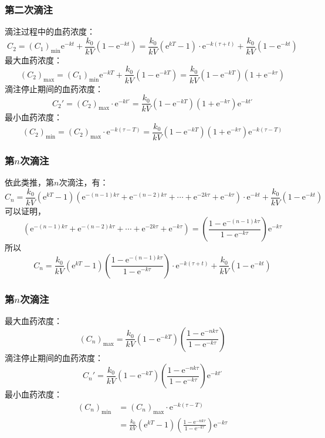 \documentclass[dvipsnames, svgnames, x11names]{beamer}
\begin{document}
\begin{frame}
	\frametitle{第二次滴注}
	滴注过程中的血药浓度：
	\[
		C_2 = (C_1)_\mathrm{min}\mathrm{e}^{-kt} + \frac{k_0}{kV}(1-\mathrm{e}^{-kt}) = \frac{k_0}{kV}(\mathrm{e}^{kT}-1)\cdot \mathrm{e}^{-k(\tau +t)} + \frac{k_0}{kV}(1-\mathrm{e}^{-kt})
	\]
	最大血药浓度：
	\[
		(C_2)_\mathrm{max} = (C_1)_\mathrm{min}\mathrm{e}^{-kT} + \frac{k_0}{kV}(1-\mathrm{e}^{-kT}) = \frac{k_0}{kV}(1-\mathrm{e}^{-kT})(1+\mathrm{e}^{-k\tau})
	\]
	滴注停止期间的血药浓度：
	\[
		C_2' = (C_2)_\mathrm{max}\cdot \mathrm{e}^{-kt'} = \frac{k_0}{kV}(1-\mathrm{e}^{-kT})(1+\mathrm{e}^{-k\tau})\mathrm{e}^{-kt'}
	\]
	最小血药浓度：
	\[
		(C_2)_\mathrm{min} = (C_2)_\mathrm{max}\cdot \mathrm{e}^{-k(\tau - T)} = \frac{k_0}{kV}(1-\mathrm{e}^{-kT})(1+\mathrm{e}^{-k\tau})\mathrm{e}^{-k(\tau - T)}
	\]
\end{frame}


\begin{frame}
	\frametitle{第$n$次滴注}
	依此类推，第$n$次滴注，有：
	\[
		C_n = \frac{k_0}{kV}(\mathrm{e}^{kT}-1)(\mathrm{e}^{-(n-1)k\tau}+\mathrm{e}^{-(n-2)k\tau}+\cdots +\mathrm{e}^{-2k\tau}+\mathrm{e}^{-k\tau})\cdot \mathrm{e}^{-kt} + \frac{k_0}{kV}(1-\mathrm{e}^{-kt})
	\]
	可以证明，
	\[
		(\mathrm{e}^{-(n-1)k\tau}+\mathrm{e}^{-(n-2)k\tau}+\cdots +\mathrm{e}^{-2k\tau}+\mathrm{e}^{-k\tau}) = \left(\frac{1-\mathrm{e}^{-(n-1)k\tau}}{1-\mathrm{e}^{-k\tau}}\right)\mathrm{e}^{-k\tau}
	\]
	所以
	\[
		C_n = \frac{k_0}{kV}(\mathrm{e}^{kT}-1)\left(\frac{1-\mathrm{e}^{-(n-1)k\tau}}{1-\mathrm{e}^{-k\tau}}\right)\cdot \mathrm{e}^{-k(\tau + t)} + \frac{k_0}{kV}(1-\mathrm{e}^{-kt})
	\]
\end{frame}


\begin{frame}
	\frametitle{第$n$次滴注}
	最大血药浓度：
	\[
		(C_n)_\mathrm{max} = \frac{k_0}{kV}(1-\mathrm{e}^{-kT})\left(\frac{1-\mathrm{e}^{-nk\tau}}{1-\mathrm{e}^{-k\tau}}\right)
	\]
	滴注停止期间的血药浓度：
	\[
		C_n' = \frac{k_0}{kV}(1-\mathrm{e}^{-kT})\left(\frac{1-\mathrm{e}^{-nk\tau}}{1-\mathrm{e}^{-k\tau}}\right)\mathrm{e}^{-kt'}
	\]
	最小血药浓度：
	\[
		\begin{aligned}
			(C_n)_\mathrm{min} &= (C_n)_\mathrm{max}\cdot \mathrm{e}^{-k(\tau - T)} \\
			&= \frac{k_0}{kV}(\mathrm{e}^{kT}-1)\left(\frac{1-\mathrm{e}^{-nk\tau}}{1-\mathrm{e}^{-k\tau}}\right)\mathrm{e}^{-k\tau}
		\end{aligned}
	\]
\end{frame}
\end{document}

